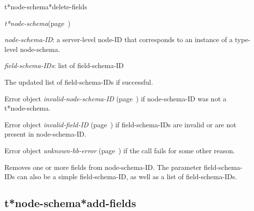 \begin{description}
\item [Name:]  t*node-schema*delete-fields

\item [Class:] {\sl t*node-schema}\hfill(page~\pageref{t*node-schema})

\item [Parameters:]
\item {\sl node-schema-ID}:  a server-level node-ID that corresponds to an 
instance of a type-level node-schema. 


\item {\sl field-schema-IDs}:  list of field-schema-ID
 

\item [Return-value:]
The updated list of field-schema-IDs if successful.

Error object {\sl invalid-node-schema-ID} (page~\pageref{invalid-node-schema-ID}) if
node-schema-ID was not a t*node-schema.

Error object {\sl invalid-field-ID} (page~\pageref{invalid-field-ID}) if field-schema-IDs 
are invalid or are not present in node-schema-ID.

Error object {\sl unknown-hb-error} (page~\pageref{unknown-hb-error}) if the call fails
for some other reason.

\item [Description:]

Removes one or more fields from node-schema-ID. 
The parameter field-schema-IDs can also be a simple 
field-schema-ID, as well as a list of field-schema-IDs.


\item [Public:]



\end{description}
\horizontalline

\subsection{t*node-schema*add-fields}
\label{t*node-schema*add-fields}

